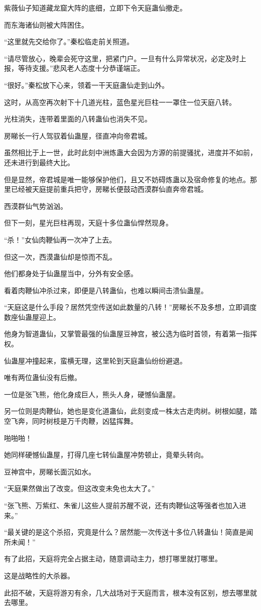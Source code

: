 \begin{this_body}
紫薇仙子知道藏龙窟大阵的底细，立即下令天庭蛊仙撤走。

而东海诸仙则被大阵困住。

“这里就先交给你了。”秦松临走前关照道。

“请尽管放心，晚辈会死守这里，把紧门户。一旦有什么异常状况，必定及时上报，等待支援。”悲风老人态度十分恭谨端正。

“很好。”秦松放下心来，领着一干天庭蛊仙走到山外。

这时，从高空再次射下十几道光柱，蓝色星光巨柱一一罩住一位天庭八转。

光柱消失，连带着里面的八转蛊仙也消失不见。

房睇长一行人驾驭着仙蛊屋，径直冲向帝君城。

虽然相比于上一世，此时此刻中洲炼蛊大会因为方源的前提骚扰，进度并不如前，还未进行到最终大比。

但是显然，帝君城是唯一能够保护他们，且又不妨碍炼蛊以及宿命修复的地点。那里已经被天庭提前重兵把守，房睇长便鼓动西漠群仙直奔帝君城。

西漠群仙气势汹汹。

但下一刻，星光巨柱再现，天庭十多位蛊仙悍然现身。

“杀！”女仙肉鞭仙再一次冲了上去。

但这一次，西漠蛊仙却是惊而不乱。

他们都身处于仙蛊屋当中，分外有安全感。

看着肉鞭仙冲杀过来，即便是八转蛊仙，也难以瞬间击溃仙蛊屋。

“天庭这是什么手段？居然凭空传送如此数量的八转！”房睇长不及多想，立即调度数座仙蛊屋迎上。

他身为智道蛊仙，又掌管最强的仙蛊屋豆神宫，被公选为临时首领，有着第一指挥权。

仙蛊屋冲撞起来，蛮横无理，这里轮到天庭蛊仙纷纷避退。

唯有两位蛊仙没有后撤。

一位是张飞熊，他化身成巨人，熊头人身，硬憾仙蛊屋。

另一位则是肉鞭仙，她也是变化道蛊仙，此刻变成一株太古走肉树。树根如腿，踏空飞奔，同时树枝是万千肉鞭，凶猛挥舞。

啪啪啪！

她同样硬憾仙蛊屋，打得几座七转仙蛊屋冲势顿止，竟晕头转向。

豆神宫中，房睇长面沉如水。

“天庭果然做出了改变。但这改变未免也太大了。”

“张飞熊、万紫红、朱雀儿这些人提前苏醒不说，还有肉鞭仙这等强者也加入进来。”

“最关键的是这个杀招，究竟是什么？居然能一次传送十多位八转蛊仙！简直是闻所未闻！”

有了此招，天庭将完全占据主动，随意调动主力，想打哪里就打哪里。

这是战略性的大杀器。

此招不破，天庭将游刃有余，几大战场对于天庭而言，根本没有区别，想去哪里就去哪里。

\end{this_body}

